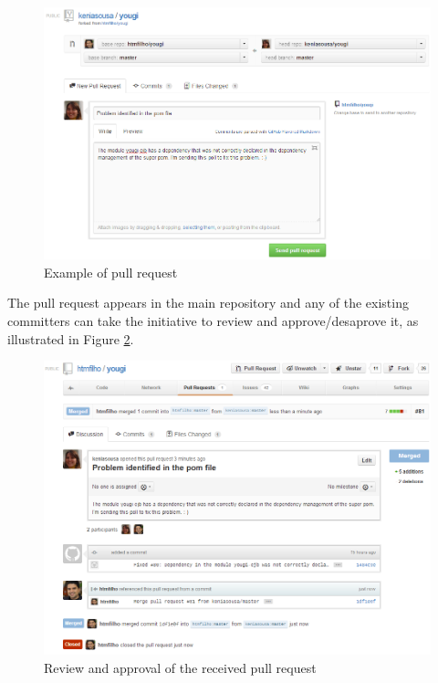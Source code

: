 \documentclass[envcountsame,envcountchap]{svmono}
\begin{document}
\begin{figure}
\centering
\includegraphics[scale=.46]{figures/github-pull-request-example}
\caption{Example of pull request}
\label{fig:github-pull-request-example}
\end{figure}

The pull request appears in the main repository and any of the existing committers can take the initiative to review and approve/desaprove it, as illustrated in Figure \ref{fig:github-pull-request-merged-closed}.

\begin{figure}
\centering
\includegraphics[scale=.46]{figures/github-pull-request-merged-closed}
\caption{Review and approval of the received pull request}
\label{fig:github-pull-request-merged-closed}
\end{figure}
\end{document}
